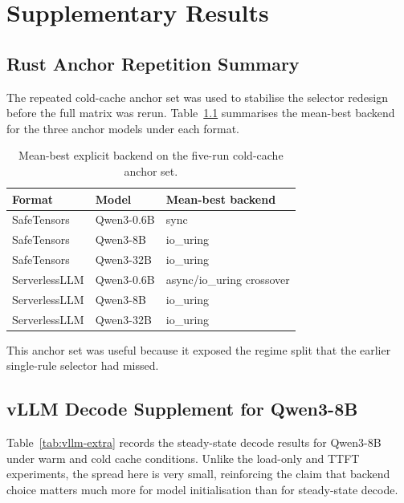 \chapter{Supplementary Results}
\label{app:supplementary_results}

\section{Rust Anchor Repetition Summary}

The repeated cold-cache anchor set was used to stabilise the selector redesign before the full matrix was rerun. Table~\ref{tab:anchor-summary} summarises the mean-best backend for the three anchor models under each format.

\begin{table}[h]
\caption{Mean-best explicit backend on the five-run cold-cache anchor set.}
\label{tab:anchor-summary}
\centering
\begin{tabular}{lll}
\toprule
Format & Model & Mean-best backend \\
\midrule
SafeTensors & Qwen3-0.6B & sync \\
SafeTensors & Qwen3-8B & io\_uring \\
SafeTensors & Qwen3-32B & io\_uring \\
ServerlessLLM & Qwen3-0.6B & async/io\_uring crossover \\
ServerlessLLM & Qwen3-8B & io\_uring \\
ServerlessLLM & Qwen3-32B & io\_uring \\
\bottomrule
\end{tabular}
\end{table}

This anchor set was useful because it exposed the regime split that the earlier single-rule selector had missed.

\section{vLLM Decode Supplement for Qwen3-8B}

Table~\ref{tab:vllm-extra} records the steady-state decode results for Qwen3-8B under warm and cold cache conditions. Unlike the load-only and TTFT experiments, the spread here is very small, reinforcing the claim that backend choice matters much more for model initialisation than for steady-state decode.

